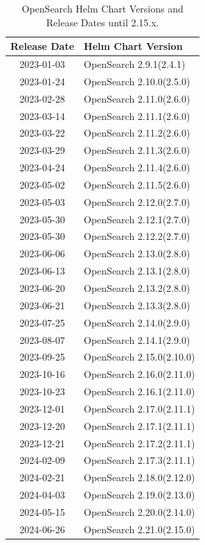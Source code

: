\documentclass[../main.tex]{subfiles}
\begin{document}
\begin{table}[h]
\centering
\begin{tabular}{|c|l|}
\hline
\textbf{Release Date} & \textbf{Helm Chart Version} \\ \hline
    2023-01-03 & OpenSearch 2.9.1(2.4.1) \\ \hline
    2023-01-24 & OpenSearch 2.10.0(2.5.0) \\ \hline
    2023-02-28 & OpenSearch 2.11.0(2.6.0) \\ \hline  
    2023-03-14 & OpenSearch 2.11.1(2.6.0) \\ \hline 
    2023-03-22 & OpenSearch 2.11.2(2.6.0) \\ \hline 
    2023-03-29 & OpenSearch 2.11.3(2.6.0) \\ \hline  
    2023-04-24 & OpenSearch 2.11.4(2.6.0) \\ \hline
    2023-05-02 & OpenSearch 2.11.5(2.6.0) \\ \hline  
    2023-05-03 & OpenSearch 2.12.0(2.7.0) \\ \hline  
    2023-05-30 & OpenSearch 2.12.1(2.7.0) \\ \hline  
    2023-05-30 & OpenSearch 2.12.2(2.7.0) \\ \hline 
    2023-06-06 & OpenSearch 2.13.0(2.8.0) \\ \hline  
    2023-06-13 & OpenSearch 2.13.1(2.8.0) \\ \hline  
    2023-06-20 & OpenSearch 2.13.2(2.8.0) \\ \hline  
    2023-06-21 & OpenSearch 2.13.3(2.8.0) \\ \hline  
    2023-07-25 & OpenSearch 2.14.0(2.9.0) \\ \hline  
    2023-08-07 & OpenSearch 2.14.1(2.9.0) \\ \hline
    2023-09-25 & OpenSearch 2.15.0(2.10.0) \\ \hline  
    2023-10-16 & OpenSearch 2.16.0(2.11.0) \\ \hline 
    2023-10-23 & OpenSearch 2.16.1(2.11.0) \\ \hline  
    2023-12-01 & OpenSearch 2.17.0(2.11.1) \\ \hline  
    2023-12-20 & OpenSearch 2.17.1(2.11.1) \\ \hline  
    2023-12-21 & OpenSearch 2.17.2(2.11.1) \\ \hline 
    2024-02-09 & OpenSearch 2.17.3(2.11.1) \\ \hline 
    2024-02-21 & OpenSearch 2.18.0(2.12.0) \\ \hline  
    2024-04-03 & OpenSearch 2.19.0(2.13.0) \\ \hline  
    2024-05-15 & OpenSearch 2.20.0(2.14.0) \\ \hline  
    2024-06-26 & OpenSearch 2.21.0(2.15.0) \\ \hline  
\end{tabular}
\caption{OpenSearch Helm Chart Versions and Release Dates until 2.15.x. \protect\footnotemark}
\label{table:opensearch_helm_versions}
\end{table}
\end{document}
